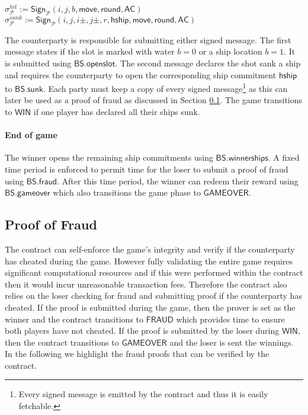 \documentclass{llncs}
\newcommand{\instantiatedno}{\mathsf{NO}}
\newcommand{\instantiatedyes}{\mathsf{YES}}
\newcommand{\gamewinner}{\mathsf{WIN}}
\newcommand{\gamefraud}{\mathsf{FRAUD}}
\newcommand{\gamefinished}{\mathsf{GAMEOVER}}
\newcommand{\hship}{\mathsf{hship}}
\newcommand{\hshiplocation}{\mathsf{hshiplocation}}
\newcommand{\participant}{\mathcal{P}}
\newcommand{\sign}{\mathsf{Sign}}
\newcommand{\battleshipfraud}{\mathsf{BS.fraud}}
\newcommand{\battleshiprevealslot}{\mathsf{BS.openslot}}
\newcommand{\battleshipsinking}{\mathsf{BS.sunk}}
\newcommand{\battleshiprevealships}{\mathsf{BS.winnerships}}
\newcommand{\battleshipgameover}{\mathsf{BS.gameover}}
\newcommand{\appcontract}{\mathsf{AC}}
\begin{document}
\begin{center}
	$\sigma^{hit}_{\participant} := \sign_{\participant}(i,j,b,\mathsf{move}, \mathsf{round},\appcontract)$ \\ $\sigma^{sunk}_{\participant} := \sign_{\participant}(i,j,i\pm,j\pm,r,\hship,\mathsf{move}, \mathsf{round},\appcontract)$
\end{center}

The counterparty is responsible for submitting either signed message. 
The first message states if the slot is marked with water $b=0$ or a ship location $b=1$.
It is submitted using $\battleshiprevealslot$.
The second message declares the shot sank a ship and requires the counterparty to open the corresponding ship commitment $\hship$ to $\battleshipsinking$. 
Each party must keep a copy of every signed message\footnote{Every signed message is emitted by the contract and thus it is easily fetchable.} as this can later be used as a proof of fraud as discussed in Section \ref{sec:fraud}.
The game transitions to $\gamewinner$ if one player has declared all their ships sunk. 

\paragraph{End of game} 

The winner opens the remaining ship commitments using $\battleshiprevealships$.
A fixed time period is enforced to permit time for the loser to submit a proof of fraud using $\battleshipfraud$.
After this time period, the winner can redeem their reward using $\battleshipgameover$ which also transitions the game phase to $\gamefinished$. 


\subsection{Proof of Fraud} \label{sec:fraud}


The contract can self-enforce the game's integrity and verify if the counterparty has cheated during the game.
However fully validating the entire game requires significant computational resources and if this were performed within the contract then it would incur unreasonable transaction fees. 
Therefore the contract also relies on the loser checking for fraud and submitting proof if the counterparty has cheated. 
If the proof is submitted during the game, then the prover is set as the winner and the contract transitions to $\gamefraud$ which provides time to ensure both players have not cheated. 
If the proof is submitted by the loser during $\gamewinner$, then the contract transitions to $\gamefinished$ and the loser is sent the winnings.
In the following we highlight the fraud proofs that can be verified by the contract. 
\end{document}
